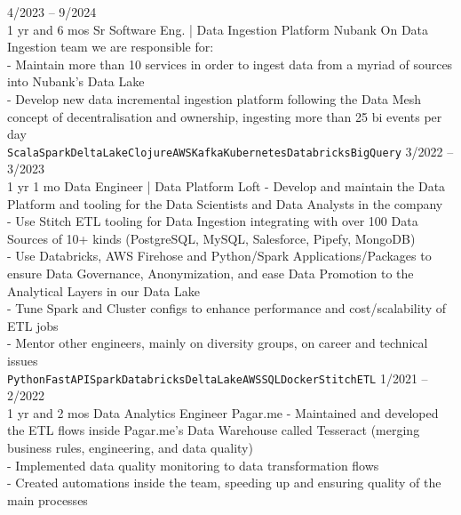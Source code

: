\documentclass[9pt]{developercv} %
\begin{document}
\begin{entrylist}
	\entry
		{4/2023 -- 9/2024 \\\footnotesize{1 yr and 6 mos}}
		{Sr Software Eng. | Data Ingestion Platform}
		{Nubank}
		{
On Data Ingestion team we are responsible for:
\\ - Maintain more than 10 services in order to ingest data from a myriad of sources into Nubank's Data Lake
\\- Develop new data incremental ingestion platform following the Data Mesh concept of decentralisation and ownership, ingesting more than 25 bi events per day
\\\texttt{Scala}\slashsep\texttt{Spark}\slashsep\texttt{DeltaLake}\slashsep\texttt{Clojure}\slashsep\texttt{AWS}\slashsep\texttt{Kafka}\slashsep\texttt{Kubernetes}\slashsep\texttt{Databricks}\slashsep\texttt{BigQuery}}
	\entry
		{3/2022 -- 3/2023 \\\footnotesize{1 yr 1 mo}}
		{Data Engineer | Data Platform}
		{Loft}
		{- Develop and maintain the Data Platform and tooling for the Data Scientists and Data Analysts in the company
\\- Use Stitch ETL tooling for Data Ingestion integrating with over 100 Data Sources of 10+ kinds (PostgreSQL, MySQL, Salesforce, Pipefy, MongoDB)
\\- Use Databricks, AWS Firehose and Python/Spark Applications/Packages to ensure Data Governance, Anonymization, and ease Data Promotion to the Analytical Layers in our Data Lake
\\- Tune Spark and Cluster configs to enhance performance and cost/scalability of ETL jobs
\\- Mentor other engineers, mainly on diversity groups, on career and technical issues \\ \texttt{Python}\slashsep\texttt{FastAPI}\slashsep\texttt{Spark}\slashsep\texttt{Databricks}\slashsep\texttt{DeltaLake}\slashsep\texttt{AWS}\slashsep\texttt{SQL}\slashsep\texttt{Docker}\slashsep\texttt{StitchETL}}
	\entry
		{1/2021 -- 2/2022 \\\footnotesize{1 yr and 2 mos}}
		{Data Analytics Engineer}
		{Pagar.me}
		{- Maintained and developed the ETL flows inside Pagar.me's Data Warehouse called Tesseract (merging business rules, engineering, and data quality)\\
  - Implemented data quality monitoring to data transformation flows\\
  - Created automations inside the team, speeding up and ensuring quality of the main processes \\
}
\end{entrylist}
\end{document}
